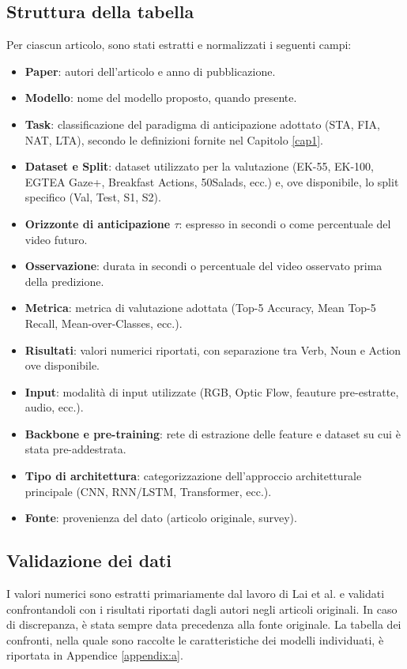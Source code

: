 \subsection{Struttura della tabella}
Per ciascun articolo, sono stati estratti e normalizzati i seguenti campi:
\begin{itemize}
    \item \textbf{Paper}: autori dell'articolo e anno di pubblicazione.
    \item \textbf{Modello}: nome del modello proposto, quando presente.
    \item \textbf{Task}: classificazione del paradigma di anticipazione adottato (STA, FIA, NAT, LTA), secondo le definizioni fornite nel Capitolo \ref{cap1}.
    \item \textbf{Dataset e Split}: dataset utilizzato per la valutazione (EK-55, EK-100, EGTEA Gaze+, Breakfast Actions, 50Salads, ecc.) e, ove disponibile, lo split specifico (Val, Test, S1, S2).
    \item \textbf{Orizzonte di anticipazione $\tau$}: espresso in secondi o come percentuale del video futuro.
    \item \textbf{Osservazione}: durata in secondi o percentuale del video osservato prima della predizione.
    \item \textbf{Metrica}: metrica di valutazione adottata (Top-5 Accuracy, Mean Top-5 Recall, Mean-over-Classes, ecc.).
    \item \textbf{Risultati}: valori numerici riportati, con separazione tra Verb, Noun e Action ove disponibile.
    \item \textbf{Input}: modalità di input utilizzate (RGB, Optic Flow, feauture pre-estratte, audio, ecc.).
    \item \textbf{Backbone e pre-training}: rete di estrazione delle feature e dataset su cui è stata pre-addestrata.
    \item \textbf{Tipo di architettura}: categorizzazione dell'approccio architetturale principale (CNN, RNN/LSTM, Transformer, ecc.).
    \item \textbf{Fonte}: provenienza del dato (articolo originale, survey).
\end{itemize}

\subsection{Validazione dei dati}
I valori numerici sono estratti primariamente dal lavoro di Lai et al. \cite{lai2024human} e validati confrontandoli con i risultati riportati dagli autori negli articoli originali. In caso di discrepanza, è stata sempre data precedenza alla fonte originale. La tabella dei confronti, nella quale sono raccolte le caratteristiche dei modelli individuati, è riportata in Appendice \ref{appendix:a}.

